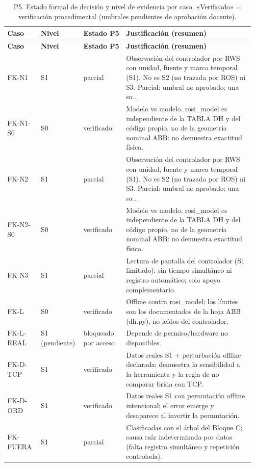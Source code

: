 \begingroup
\scriptsize
\setlength{\tabcolsep}{2.5pt}
\renewcommand{\arraystretch}{1.12}
\begin{longtable}{lllp{9cm}}
\caption{P5. Estado formal de decisión y nivel de evidencia por caso. «Verificado» = verificación procedimental (umbrales pendientes de aprobación docente).}\label{tab:P5}\\
\toprule
\textbf{Caso} & \textbf{Nivel} & \textbf{Estado P5} & \textbf{Justificación (resumen)} \\
\midrule
\endfirsthead
\toprule
\textbf{Caso} & \textbf{Nivel} & \textbf{Estado P5} & \textbf{Justificación (resumen)} \\
\midrule
\endhead
\bottomrule
\endfoot
FK-N1 & S1 & parcial & Observaci\'on del controlador por RWS con unidad, fuente y marca temporal (S1). No es S2 (no trazada por ROS) ni S3. Parcial: umbral no aprobado; una so... \\
FK-N1-S0 & S0 & verificado & Modelo vs modelo. rosi\_model es independiente de la TABLA DH y del c\'odigo propio, no de la geometr\'ia nominal ABB: no demuestra exactitud f\'isica. \\
FK-N2 & S1 & parcial & Observaci\'on del controlador por RWS con unidad, fuente y marca temporal (S1). No es S2 (no trazada por ROS) ni S3. Parcial: umbral no aprobado; una so... \\
FK-N2-S0 & S0 & verificado & Modelo vs modelo. rosi\_model es independiente de la TABLA DH y del c\'odigo propio, no de la geometr\'ia nominal ABB: no demuestra exactitud f\'isica. \\
FK-N3 & S1 & parcial & Lectura de pantalla del controlador (S1 limitado): sin tiempo simult\'aneo ni registro autom\'atico; solo apoyo complementario. \\
FK-L & S0 & verificado & Offline contra rosi\_model; los l\'imites son los documentados de la hoja ABB (dh.py), no le\'idos del controlador. \\
FK-L-REAL & S1 (pendiente) & bloqueado por acceso & Depende de permiso/hardware no disponibles. \\
FK-D-TCP & S1 & verificado & Datos reales S1 + perturbaci\'on offline declarada: demuestra la sensibilidad a la herramienta y la regla de no comparar brida con TCP. \\
FK-D-ORD & S1 & verificado & Datos reales S1 con permutaci\'on offline intencional; el error emerge y desaparece al invertir la permutaci\'on. \\
FK-FUERA & S1 & parcial & Clasificadas con el \'arbol del Bloque C; causa ra\'iz indeterminada por datos (falta registro simult\'aneo y repetici\'on controlada). \\

\end{longtable}
